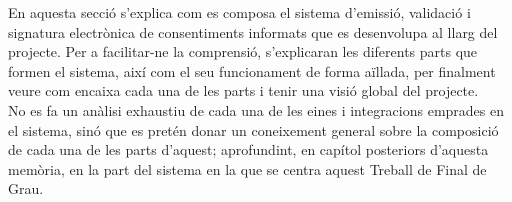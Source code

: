 En aquesta secció s'explica com es composa el sistema d'emissió, validació i signatura electrònica de consentiments informats que es desenvolupa al llarg del projecte. Per a facilitar-ne la comprensió, s'explicaran les diferents parts que formen el sistema, així com el seu funcionament de forma aïllada, per finalment veure com encaixa cada una de les parts i tenir una visió global del projecte.\\
\newline No es fa un anàlisi exhaustiu de cada una de les eines i integracions emprades en el sistema, sinó que es pretén donar un coneixement general sobre la composició de cada una de les parts d'aquest; aprofundint, en capítol posteriors d'aquesta memòria, en la part del sistema en la que se centra aquest Treball de Final de Grau.


\clearpage

\clearpage

\clearpage

\clearpage